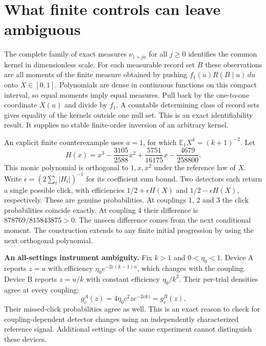 \section{What finite controls can leave ambiguous}
The complete family of exact measures $\nu_{1+ja}$ for all $j\ge0$ identifies the common kernel in dimensionless scale. For each measurable record set $B$ these observations are all moments of the finite measure obtained by pushing $f_1(u)R(B\mid u)\,du$ onto $X\in[0,1]$. Polynomials are dense in continuous functions on this compact interval, so equal moments imply equal measures. Pull back by the one-to-one coordinate $X(u)$ and divide by $f_1$. A countable determining class of record sets gives equality of the kernels outside one null set. This is an exact identifiability result. It supplies no stable finite-order inversion of an arbitrary kernel.

An explicit finite counterexample uses $a=1$, for which $\mathbb E_1 X^k=(k+1)^{-2}$. Let
\[
 H(x)=x^3-\frac{3105}{2588}x^2+\frac{5751}{16175}x-\frac{4679}{258800}.
\]
This monic polynomial is orthogonal to $1,x,x^2$ under the reference law of $X$. Write $\epsilon=(2\sum_i|H_i|)^{-1}$ for its coefficient sum bound. Two detectors each return a single possible click, with efficiencies $1/2+\epsilon H(X)$ and $1/2-\epsilon H(X)$, respectively. These are genuine probabilities. At couplings 1, 2 and 3 the click probabilities coincide exactly. At coupling 4 their difference is $878769/815843875>0$. The unseen difference comes from the next conditional moment. The construction extends to any finite initial progression by using the next orthogonal polynomial.

\textbf{An all-settings instrument ambiguity.} Fix $k>1$ and $0<\eta_0<1$. Device A reports $z=u$ with efficiency $\eta_0 e^{-2c(k-1)u}$, which changes with the coupling. Device B reports $z=u/k$ with constant efficiency $\eta_0/k^2$. Their per-trial densities agree at every coupling:
\[
 g_c^A(z)=4\eta_0c^2z e^{-2ckz}=g_c^B(z).
\]
Their missed-click probabilities agree as well. This is an exact reason to check for coupling-dependent detector changes using an independently characterized reference signal. Additional settings of the same experiment cannot distinguish these devices.

